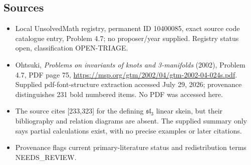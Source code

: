 \documentclass[11pt]{article}
\begin{document}
\subsection{Sources}
\begin{itemize}
\item Local UnsolvedMath registry, permanent ID 10400085, exact source code catalogue entry, Problem 4.7; no proposer/year supplied. Registry status open, classification OPEN-TRIAGE.
\item Ohtsuki, \emph{Problems on invariants of knots and 3-manifolds} (2002), Problem 4.7, PDF page 75, \url{https://msp.org/gtm/2002/04/gtm-2002-04-024s.pdf}. Supplied pdf-font-structure extraction accessed July 29, 2026; provenance distinguishes 231 bold numbered items. No PDF was accessed here.
\item The source cites [233,323] for the defining $\mathfrak{sl}_3$ linear skein, but their bibliography and relation diagrams are absent. The supplied summary only says partial calculations exist, with no precise examples or later citations.
\item Provenance flags current primary-literature status and redistribution terms NEEDS\_REVIEW.
\end{itemize}
\end{document}

